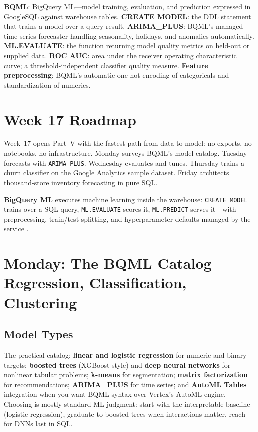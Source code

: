 \begin{keyterms}
\textbf{BQML}: BigQuery ML---model training, evaluation, and prediction expressed in GoogleSQL against warehouse tables.
\textbf{CREATE MODEL}: the DDL statement that trains a model over a query result.
\textbf{ARIMA\_PLUS}: BQML's managed time-series forecaster handling seasonality, holidays, and anomalies automatically.
\textbf{ML.EVALUATE}: the function returning model quality metrics on held-out or supplied data.
\textbf{ROC AUC}: area under the receiver operating characteristic curve; a threshold-independent classifier quality measure.
\textbf{Feature preprocessing}: BQML's automatic one-hot encoding of categoricals and standardization of numerics.
\end{keyterms}

\section{Week 17 Roadmap}
Week~17 opens Part~V with the fastest path from data to model: no exports, no notebooks, no infrastructure. Monday surveys BQML's model catalog. Tuesday forecasts with \texttt{ARIMA\_PLUS}. Wednesday evaluates and tunes. Thursday trains a churn classifier on the Google Analytics sample dataset. Friday architects thousand-store inventory forecasting in pure SQL.

\begin{definitionbox}
\textbf{BigQuery ML} executes machine learning inside the warehouse: \texttt{CREATE MODEL} trains over a SQL query, \texttt{ML.EVALUATE} scores it, \texttt{ML.PREDICT} serves it---with preprocessing, train/test splitting, and hyperparameter defaults managed by the service \cite{googlecloudbqmldocs}.
\end{definitionbox}

\section{Monday: The BQML Catalog---Regression, Classification, Clustering}

\subsection{Model Types}
The practical catalog: \textbf{linear and logistic regression} for numeric and binary targets; \textbf{boosted trees} (XGBoost-style) and \textbf{deep neural networks} for nonlinear tabular problems; \textbf{k-means} for segmentation; \textbf{matrix factorization} for recommendations; \textbf{ARIMA\_PLUS} for time series; and \textbf{AutoML Tables} integration when you want BQML syntax over Vertex's AutoML engine. Choosing is mostly standard ML judgment: start with the interpretable baseline (logistic regression), graduate to boosted trees when interactions matter, reach for DNNs last in SQL.

